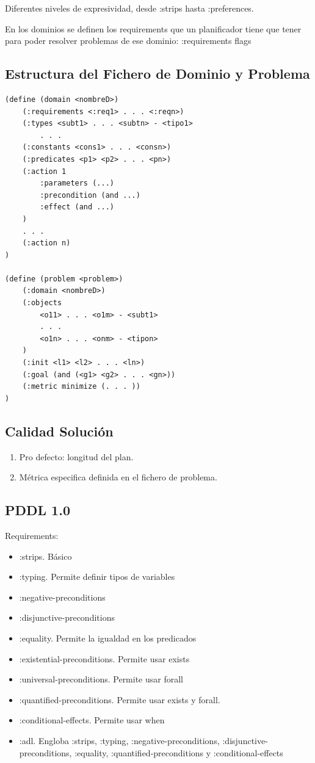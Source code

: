 \documentclass[12pt, twoside, openright]{report} %
\begin{document}
Diferentes niveles de expresividad, desde :strips hasta :preferences.

En los dominios se definen los  requirements que un planificador tiene  que  tener para poder resolver problemas de ese dominio: :requirements flags

\subsection{Estructura del Fichero de Dominio y Problema}
\begin{lstlisting}
(define (domain <nombreD>)
	(:requirements <:req1> . . . <:reqn>)
	(:types <subt1> . . . <subtn> - <tipo1>
		. . .
	(:constants <cons1> . . . <consn>)
	(:predicates <p1> <p2> . . . <pn>)
	(:action 1
		:parameters (...)
		:precondition (and ...)
		:effect (and ...)
	)
	. . .
	(:action n)
)

(define (problem <problem>)
	(:domain <nombreD>)
	(:objects
		<o11> . . . <o1m> - <subt1>
		. . .
		<o1n> . . . <onm> - <tipon>
	) 
	(:init <l1> <l2> . . . <ln>)
	(:goal (and (<g1> <g2> . . . <gn>))
	(:metric minimize (. . . ))
)
\end{lstlisting}

\subsection{Calidad Solución}
\begin{enumerate}
	\item Pro defecto: longitud del plan.
	\item Métrica especifica definida en el fichero de problema.
\end{enumerate}

\subsection{PDDL 1.0}
Requirements:
\begin{itemize}
	\item :strips. Básico
	\item :typing. Permite definir tipos de variables
	\item :negative-preconditions
	\item :disjunctive-preconditions
	\item :equality. Permite la igualdad en los predicados
	\item :existential-preconditions. Permite usar exists
	\item :universal-preconditions. Permite usar forall
	\item :quantified-preconditions. Permite usar exists y forall.
	\item :conditional-effects. Permite usar when
	\item :adl. Engloba :strips, :typing, :negative-preconditions, :disjunctive-preconditions, :equality, :quantified-preconditions y :conditional-effects
\end{itemize}
\end{document}
